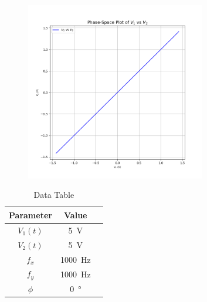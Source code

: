 \documentclass[a4paper,12pt]{article}
\begin{document}
\begin{figure}[htbp]
\begin{center}
    \includegraphics[width=0.7\textwidth]{figs/1/pyplot.png}
\end{center}
\end{figure}


\begin{table}[htbp]
    \centering
    \begin{tabular}{|c|c|c|}
        \hline
        \textbf{Parameter} & \textbf{Value} \\
        \hline
        $V_1(t)$ & \SI{5}{\volt} \\
        $V_2(t)$ & \SI{5}{\volt} \\
        $f_x$ & \SI{1000}{\hertz} \\
        $f_y$ & \SI{1000}{\hertz} \\
        $\phi$ & \SI{0}{\degree} \\
        \hline
    \end{tabular}
    \caption{Data Table}
    \label{tab:sample}
\end{table}
\end{document}
